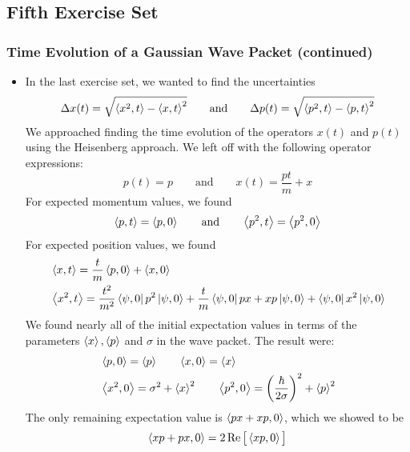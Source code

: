 \documentclass[11pt, a4paper]{article}
\newcommand{\eqtext}[1]{\qquad \text{#1} \qquad}
\begin{document}
\begin{itemize}
\end{itemize}


\subsection{Fifth Exercise Set}

\subsubsection{Time Evolution of a Gaussian Wave Packet (continued)}
\begin{itemize}
	\item In the last exercise set, we wanted to find the uncertainties
	\begin{equation*}
		\Delta x(t) = \sqrt{\ev{x^{2}, t} - \ev{x, t}^{2}} \eqtext{and} \Delta p(t) = \sqrt{\ev{p^{2}, t} - \ev{p, t}^{2}}
	\end{equation*}
	We approached finding the time evolution of the operators $ x(t) $ and $ p(t) $ using the Heisenberg approach. We left off with the following operator expressions:
	\begin{equation*}
		p(t) = p \eqtext{and} x(t) = \frac{pt}{m} + x
	\end{equation*}
	For expected momentum values, we found
	\begin{equation*}
		\ev{p, t} = \ev{p, 0} \eqtext{and} \ev{p^{2}, t} = \ev{p^{2}, 0}
	\end{equation*}
	For expected position values, we found
	\begin{align*}
		&\ev{x, t} = \frac{t}{m} \ev{p, 0} + \ev{x, 0}\\
		&\ev{x^{2}, t} = \frac{t^{2}}{m^{2}}\bra{\psi, 0} p^{2} \ket{\psi, 0} + \frac{t}{m}\bra{\psi, 0} px + xp \ket{\psi, 0} + \bra{\psi, 0} x^{2} \ket{\psi, 0}
	\end{align*}
	We found nearly all of the initial expectation values in terms of the parameters $ \ev{x}, \ev{p} $ and $ \sigma $ in the wave packet. The result were:
	\begin{align*}
		&\ev{p, 0} = \ev{p} \qquad \ev{x, 0} = \ev{x}\\
		&\ev{x^{2}, 0} = \sigma^{2} + \ev{x}^{2} \qquad \ev{p^{2}, 0} = \left(\frac{\hbar}{2\sigma}\right)^{2} + \ev{p}^{2}
	\end{align*}
	The only remaining expectation value is $ \ev{px + xp, 0} $, which we showed to be
	\begin{equation*}
		\ev{xp + px, 0} = 2\Re \big[\ev{xp, 0}\big]
	\end{equation*}

\end{itemize}
\end{document}
